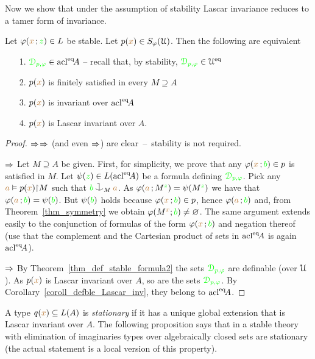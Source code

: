 Now we show that under the assumption of stability Lascar invariance reduces to a tamer form of invariance.

\begin{proposition}\label{prop_type_over_acl2}
  Let $\varphi({\color{brown} x}\,;{\color{green} z})\in L$ be stable.
  Let $p({\color{brown} x})\in S_\varphi(\EuScript U)$. 
  Then the following are equivalent
  \begin{itemize}
  \item[1.] ${\color{green}\EuScript D_{p,\varphi}}\in {\rm acl}^{{\rm eq}}\!A$ -- recall that, by stability, ${\color{green}\EuScript D_{p,\varphi}}\in\EuScript U^{{\rm eq}}$
  \item[2.] $p({\color{brown} x})$ is finitely satisfied in every $M\supseteq A$
  \item[3.] $p({\color{brown} x})$ is invariant over ${\rm acl}^{{\rm eq}}\!A$
  \item[4.] $p({\color{brown} x})$ is Lascar invariant over $A$.
  \end{itemize}
\end{proposition}
\begin{proof}
  $\Rightarrow$$\Rightarrow$ (and even $\Rightarrow$) are clear~--~stability is not required.

  $\Rightarrow$
  Let $M\supseteq A$ be given.
  First, for simplicity, we prove that any $\varphi({\color{brown} x}\,;{\color{green} b})\in p$ is satisfied in $M$.
  Let $\psi({\color{green} z})\in L({\rm acl}^{{\rm eq}}\!A)$ be a formula defining ${\color{green}\EuScript D_{p,\varphi}}$.
  Pick any ${\color{brown} a}\vDash p({\color{brown} x}){\restriction} M$ such that ${\gr b}\cnonfork_M{\mr a}$.
  As $\varphi({\color{brown} a}\,;M^{\color{green} z})=\psi(M^{\color{green} z})$ we have that $\varphi({\color{brown} a}\,;{\color{green} b})=\psi({\color{green} b})$.
  But $\psi({\color{green} b})$ holds because $\varphi({\color{brown} x}\,;{\color{green} b})\in p$, hence $\varphi({\color{brown} a}\,;{\color{green} b})$ and, from Theorem~\ref{thm_symmetry} we obtain $\varphi(M^{\color{brown} x};{\color{green} b})\neq\varnothing$.
  The same argument extends easily to the conjunction of formulas of the form $\varphi({\color{brown} x}\,;{\color{green} b})$ and negation thereof (use that the complement and the Cartesian product of sets in ${\rm acl}^{{\rm eq}}\!A$ is again ${\rm acl}^{{\rm eq}}\!A$).
 
  $\Rightarrow$ By Theorem~\ref{thm_def_stable_formula2} the sets ${\color{green}\EuScript D_{p,\varphi}}$ are definable (over $\EuScript U$).
  As $p({\color{brown} x})$ is Lascar invariant over $A$, so are the sets ${\color{green}\EuScript D_{p,\varphi}}$.
  By Corollary~\ref{coroll_defble_Lascar_inv}, they belong to ${\rm acl}^{{\rm eq}}\!A$.
\end{proof}

A type $q({\color{brown} x})\subseteq L(A)$ is \emph{stationary\/} if it has a unique global extension that is Lascar invariant over $A$.
The following proposition says that in a stable theory with elimination of imaginaries types over algebraically closed sets are stationary (the actual statement is a local version of this property).

